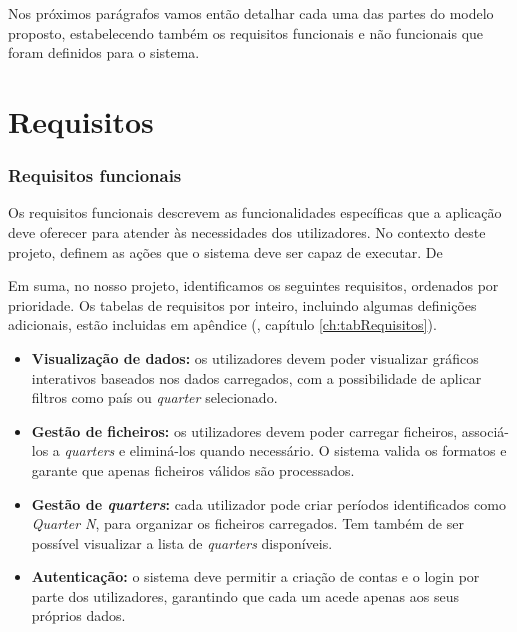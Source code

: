 Nos próximos parágrafos vamos então detalhar cada uma das partes do modelo proposto, estabelecendo também os requisitos funcionais e não funcionais que foram definidos para o sistema.

\section{Requisitos}
\label{sec:requisitos}

\subsubsection{Requisitos funcionais}

Os requisitos funcionais descrevem as funcionalidades específicas que a aplicação deve oferecer para atender às necessidades dos utilizadores. No contexto deste projeto, definem as ações que o sistema deve ser capaz de executar. De

Em suma, no nosso projeto, identificamos os seguintes requisitos, ordenados por prioridade. Os tabelas de requisitos por inteiro, incluindo algumas definições adicionais, estão incluidas em apêndice (\cf, capítulo \ref{ch:tabRequisitos}).

\begin{itemize}
    \item \textbf{Visualização de dados:} os utilizadores devem poder visualizar gráficos interativos baseados nos dados carregados, com a possibilidade de aplicar filtros como país ou \textit{quarter} selecionado.

    \item \textbf{Gestão de ficheiros:} os utilizadores devem poder carregar ficheiros, associá-los a \textit{quarters} e eliminá-los quando necessário. O sistema valida os formatos e garante que apenas ficheiros válidos são processados.
    
    \item \textbf{Gestão de \textit{quarters}:} cada utilizador pode criar períodos identificados como \textit{Quarter N}, para organizar os ficheiros carregados. Tem também de ser possível visualizar a lista de \textit{quarters} disponíveis.

    \item \textbf{Autenticação:} o sistema deve permitir a criação de contas e o login por parte dos utilizadores, garantindo que cada um acede apenas aos seus próprios dados.
    
\end{itemize}

